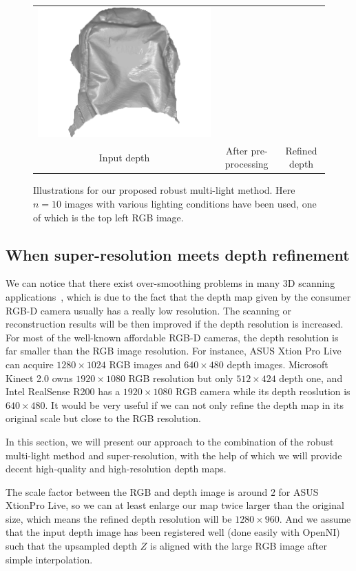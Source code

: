 \begin{figure}[!ht]
{\begin{tabular}{c| c c}
   \includegraphics[height = 0.25\linewidth]{figures/methodology/robust_backpack_shape.pdf}\\
{Input depth} & {After pre-processing} & {Refined depth}
 \end{tabular}}
\caption{Illustrations for our proposed robust multi-light method. Here $n = 10$ images with various lighting conditions have been used, one of which is the top left RGB image. }
\label{fig:robust_illustration}
\end{figure}




\subsection{When super-resolution meets depth refinement}
We can notice that there exist over-smoothing problems in many 3D scanning applications~\cite{sturm_etal_2013gcpr}, which is due to the fact that the depth map given by the consumer RGB-D camera usually has a really low resolution.
The scanning or reconstruction results will be then improved if the depth resolution is increased.
For most of the well-known affordable RGB-D cameras, the depth resolution is far smaller than the RGB image resolution.
For instance, ASUS Xtion Pro Live can acquire $1280\times 1024$ RGB images and $640\times 480$ depth images. Microsoft Kinect 2.0 owns $1920\times1080$ RGB resolution but only $512\times424$ depth one, and Intel RealSense R200 has a $1920\times1080$ RGB camera while its depth reoslution is $640\times 480$.
It would be very useful if we can not only refine the depth map in its original scale but close to the RGB resolution.  

In this section, we will present our approach to the combination of the robust multi-light method and super-resolution, with the help of which we will provide decent high-quality and high-resolution depth maps. 

The scale factor between the RGB and depth image is around $2$ for ASUS XtionPro Live, so we can at least enlarge our map twice larger than the original size, which means the refined depth resolution will be $1280\times960$.
 And we assume that the input depth image has been registered well (done easily with OpenNI) such that the upsampled depth $Z$ is aligned with the large RGB image after simple interpolation.

